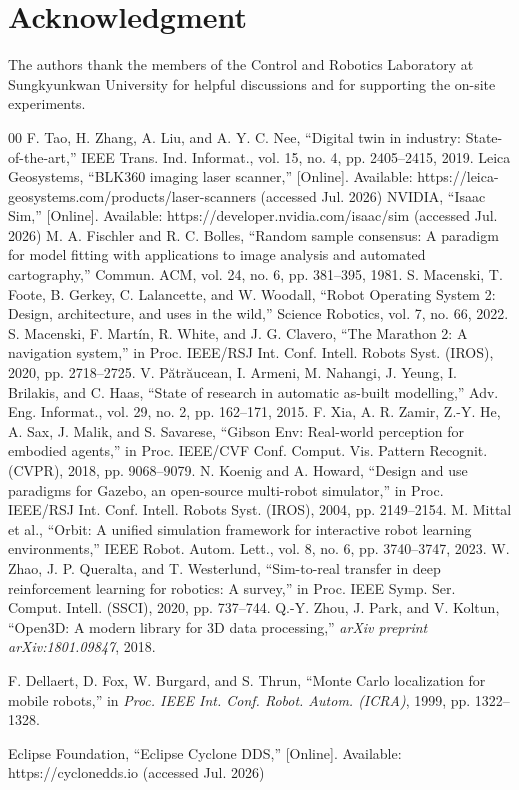 \documentclass[conference]{IEEEtran}
\begin{document}
\section*{Acknowledgment}
The authors thank the members of the Control and Robotics Laboratory
at Sungkyunkwan University for helpful discussions and for supporting
the on-site experiments.

\begin{thebibliography}{00}
 F. Tao, H. Zhang, A. Liu, and A. Y. C. Nee,
``Digital twin in industry: State-of-the-art,'' IEEE Trans. Ind.
Informat., vol. 15, no. 4, pp. 2405--2415, 2019.
 Leica Geosystems, ``BLK360 imaging laser scanner,''
[Online]. Available: https://leica-geosystems.com/products/laser-scanners (accessed Jul. 2026)
 NVIDIA, ``Isaac Sim,'' [Online]. Available:
https://developer.nvidia.com/isaac/sim (accessed Jul. 2026)
 M. A. Fischler and R. C. Bolles, ``Random sample
consensus: A paradigm for model fitting with applications to image
analysis and automated cartography,'' Commun. ACM, vol. 24, no. 6,
pp. 381--395, 1981.
 S. Macenski, T. Foote, B. Gerkey, C. Lalancette, and
W. Woodall, ``Robot Operating System 2: Design, architecture, and uses
in the wild,'' Science Robotics, vol. 7, no. 66, 2022.
 S. Macenski, F. Mart\'in, R. White, and J. G. Clavero,
``The Marathon 2: A navigation system,'' in Proc. IEEE/RSJ Int. Conf.
Intell. Robots Syst. (IROS), 2020, pp. 2718--2725.
 V. P\u{a}tr\u{a}ucean, I. Armeni, M. Nahangi,
J. Yeung, I. Brilakis, and C. Haas, ``State of research in automatic
as-built modelling,'' Adv. Eng. Informat., vol. 29, no. 2,
pp. 162--171, 2015.
 F. Xia, A. R. Zamir, Z.-Y. He, A. Sax, J. Malik, and
S. Savarese, ``Gibson Env: Real-world perception for embodied
agents,'' in Proc. IEEE/CVF Conf. Comput. Vis. Pattern Recognit.
(CVPR), 2018, pp. 9068--9079.
 N. Koenig and A. Howard, ``Design and use paradigms
for Gazebo, an open-source multi-robot simulator,'' in Proc. IEEE/RSJ
Int. Conf. Intell. Robots Syst. (IROS), 2004, pp. 2149--2154.
 M. Mittal et al., ``Orbit: A unified simulation
framework for interactive robot learning environments,'' IEEE Robot.
Autom. Lett., vol. 8, no. 6, pp. 3740--3747, 2023.
 W. Zhao, J. P. Queralta, and T. Westerlund,
``Sim-to-real transfer in deep reinforcement learning for robotics: A
survey,'' in Proc. IEEE Symp. Ser. Comput. Intell. (SSCI), 2020,
pp. 737--744.
Q.-Y. Zhou, J. Park, and V. Koltun, ``Open3D: A modern library for 3D data processing,'' \textit{arXiv preprint arXiv:1801.09847}, 2018.

F. Dellaert, D. Fox, W. Burgard, and S. Thrun, ``Monte Carlo localization for mobile robots,'' in \textit{Proc. IEEE Int. Conf. Robot. Autom. (ICRA)}, 1999, pp. 1322--1328.

 Eclipse Foundation, ``Eclipse Cyclone DDS,''
[Online]. Available: https://cyclonedds.io (accessed Jul. 2026)
\end{thebibliography}
\end{document}
